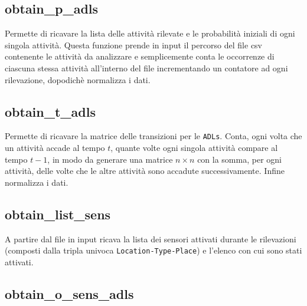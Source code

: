 \documentclass[12pt, a4paper]{scrartcl}
\begin{document}
\subsection*{obtain\_p\_adls}
Permette di ricavare la lista delle attività rilevate e le probabilità iniziali di ogni singola attività. Questa funzione prende in input il percorso del file csv contenente le attività da analizzare e semplicemente conta le occorrenze di ciascuna stessa attività all'interno del file incrementando un contatore ad ogni rilevazione, dopodichè normalizza i dati.

\subsection*{obtain\_t\_adls}
Permette di ricavare la matrice delle transizioni per le \texttt{ADLs}. Conta, ogni volta che un attività accade al tempo $t$, quante volte ogni singola attività compare al tempo $t-1$, in modo da generare una matrice $n\times n$ con la somma, per ogni attività, delle volte che le altre attività sono accadute successivamente. Infine normalizza i dati.

\subsection*{obtain\_list\_sens}
A partire dal file in input ricava la lista dei sensori attivati durante le rilevazioni (composti dalla tripla univoca \texttt{Location-Type-Place}) e l'elenco con cui sono stati attivati.

\subsection*{obtain\_o\_sens\_adls}
\end{document}
